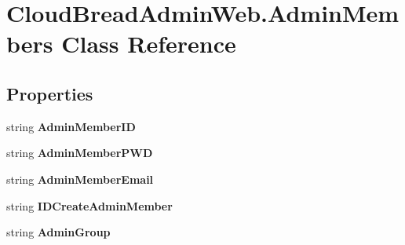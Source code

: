 \hypertarget{class_cloud_bread_admin_web_1_1_admin_members}{}\section{Cloud\+Bread\+Admin\+Web.\+Admin\+Members Class Reference}
\label{class_cloud_bread_admin_web_1_1_admin_members}
\subsection*{Properties}
\begin{DoxyCompactItemize}
\item 
string {\bfseries Admin\+Member\+ID}\hypertarget{class_cloud_bread_admin_web_1_1_admin_members_a789965c910c6e95f3022fc9cc82bfdff}{}\label{class_cloud_bread_admin_web_1_1_admin_members_a789965c910c6e95f3022fc9cc82bfdff}

\item 
string {\bfseries Admin\+Member\+P\+WD}\hypertarget{class_cloud_bread_admin_web_1_1_admin_members_a6adda13ceddd29e0bf6f5f305f8642f6}{}\label{class_cloud_bread_admin_web_1_1_admin_members_a6adda13ceddd29e0bf6f5f305f8642f6}

\item 
string {\bfseries Admin\+Member\+Email}\hypertarget{class_cloud_bread_admin_web_1_1_admin_members_a9e25237e1976bc16d10fb106e77f8af3}{}\label{class_cloud_bread_admin_web_1_1_admin_members_a9e25237e1976bc16d10fb106e77f8af3}

\item 
string {\bfseries I\+D\+Create\+Admin\+Member}\hypertarget{class_cloud_bread_admin_web_1_1_admin_members_a632bd030e0a37d82975424778c65af52}{}\label{class_cloud_bread_admin_web_1_1_admin_members_a632bd030e0a37d82975424778c65af52}

\item 
string {\bfseries Admin\+Group}\hypertarget{class_cloud_bread_admin_web_1_1_admin_members_a7adfcf8d4647e3e77dc72811c64c2072}{}\label{class_cloud_bread_admin_web_1_1_admin_members_a7adfcf8d4647e3e77dc72811c64c2072}


\end{DoxyCompactItemize}
